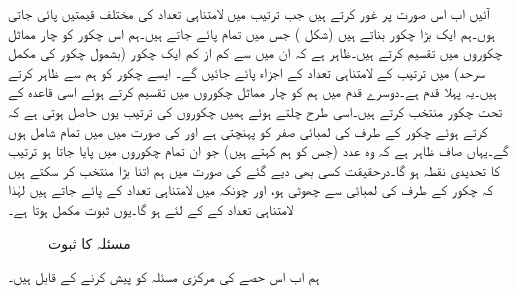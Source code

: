 آئیں اب اس صورت پر غور کرتے ہیں جب ترتیب میں لامتناہی تعداد کی مختلف قیمتیں پائی جاتی ہوں۔ہم ایک بڑا چکور  بناتے ہیں  (شکل ) جس میں تمام  پائے جاتے ہیں۔ہم اس چکور کو چار مماثل  چکوروں میں تقسیم کرتے ہیں۔ظاہر ہے کہ ان میں سے کم از کم ایک چکور (بشمول چکور کی مکمل سرحد) میں ترتیب کے لامتناہی تعداد کے اجزاء پائے جائیں گے۔ ایسے چکور کو ہم  سے ظاہر کرتے ہیں۔یہ پہلا قدم ہے۔دوسرے قدم میں ہم  کو چار مماثل چکوروں میں تقسیم کرتے ہوئے اسی قاعدہ کے تحت چکور  منتخب کرتے ہیں۔اسی طرح چلتے ہوئے ہمیں چکوروں کی ترتیب 
 یوں حاصل ہوتی ہے کہ  کرتے ہوئے چکور  کے طرف کی لمبائی صفر کو پہنچتی ہے اور  کی صورت میں  میں تمام  شامل ہوں گے۔یہاں صاف ظاہر ہے کہ  وہ عدد (جس کو ہم  کہتے ہیں) جو ان تمام چکوروں میں پایا جاتا ہو ترتیب کا تحدیدی نقطہ ہو گا۔درحقیقت کسی بھی دیے گئے  کی صورت میں ہم  اتنا بڑا منتخب کر سکتے ہیں کہ  چکور  کے  طرف کی لمبائی  سے چھوٹی ہو، اور چونکہ  میں لامتناہی تعداد کے  پائے جاتے ہیں لہٰذا  لامتناہی تعداد کے  کے لئے  ہو گا۔یوں ثبوت مکمل ہوتا ہے۔
\begin{figure}
\centering
{}
\caption{مسئلہ  کا ثبوت}
\label{شکل_مسئلہ_ترتیب_بلزانو_وائشسٹراس}
\end{figure}

ہم اب اس حصے کی مرکزی مسئلہ کو پیش کرنے کے قابل ہیں۔

